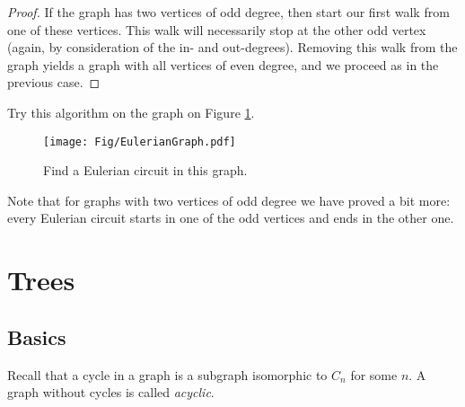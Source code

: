 \begin{page}
\begin{proof}
If the graph has two vertices of odd degree, then start our first walk from one of these vertices.
This walk will necessarily stop at the other odd vertex (again, by consideration of the in- and out-degrees).
Removing this walk from the graph yields a graph with all vertices of even degree, and we proceed as in the previous case.
\end{proof}

Try this algorithm on the graph on Figure \ref{fig:EulerianGraph}.

\begin{figure}[h]
\begin{center}
\texttt{[image: Fig/EulerianGraph.pdf]}
\end{center}
\caption{Find a Eulerian circuit in this graph.}
\label{fig:EulerianGraph}
\end{figure}

Note that for graphs with two vertices of odd degree we have proved a bit more:
every Eulerian circuit starts in one of the odd vertices and ends in the other one.












\end{page}

\begin{page}
\setcounter{section}{2}
\setcounter{subsection}{1}
\setcounter{dfn}{0}
\label{portion:243}

\section{Trees}

\end{page}

\begin{page}
\setcounter{section}{2}
\setcounter{subsection}{1}
\setcounter{dfn}{0}
\label{portion:245}

\subsection{Basics}
Recall that a cycle in a graph is a subgraph isomorphic to $C_n$ for some $n$.
A graph without cycles is called \emph{acyclic}.

\end{page}

